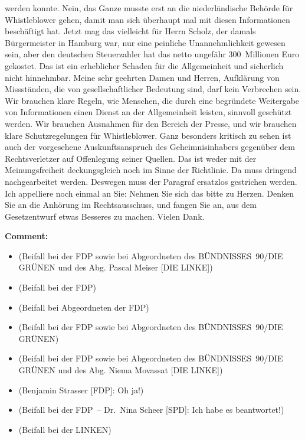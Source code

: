 \documentclass{article}
\begin{document}
werden konnte. Nein, das Ganze musste erst an die niederländische Behörde für Whistleblower gehen, damit man sich überhaupt mal mit diesen Informationen beschäftigt hat. Jetzt mag das vielleicht für Herrn Scholz, der damals Bürgermeister in Hamburg war, nur eine peinliche Unannehmlichkeit gewesen sein, aber den deutschen Steuerzahler hat das netto ungefähr 300 Millionen Euro gekostet. Das ist ein erheblicher Schaden für die Allgemeinheit und sicherlich nicht hinnehmbar.  Meine sehr geehrten Damen und Herren, Aufklärung von Missständen, die von gesellschaftlicher Bedeutung sind, darf kein Verbrechen sein. Wir brauchen klare Regeln, wie Menschen, die durch eine begründete Weitergabe von Informationen einen Dienst an der Allgemeinheit leisten, sinnvoll geschützt werden. Wir brauchen Ausnahmen für den Bereich der Presse, und wir brauchen klare Schutzregelungen für Whistleblower.  Ganz besonders kritisch zu sehen ist auch der vorgesehene Auskunftsanspruch des Geheimnisinhabers gegenüber dem Rechtsverletzer auf Offenlegung seiner Quellen. Das ist weder mit der Meinungsfreiheit deckungsgleich noch im Sinne der Richtlinie. Da muss dringend nachgearbeitet werden. Deswegen muss der Paragraf ersatzlos gestrichen werden.  Ich appelliere noch einmal an Sie: Nehmen Sie sich das bitte zu Herzen. Denken Sie an die Anhörung im Rechtsausschuss, und fangen Sie an, aus dem Gesetzentwurf etwas Besseres zu machen. Vielen Dank.  

\noindent\textbf{Comment:}
\begin{itemize}
    \setlength\itemsep{-3pt}
    \item (Beifall bei der FDP sowie bei Abgeordneten des BÜNDNISSES 90/DIE GRÜNEN und des Abg. Pascal Meiser [DIE LINKE])
    \setlength\itemsep{-3pt}
    \item (Beifall bei der FDP)
    \setlength\itemsep{-3pt}
    \item (Beifall bei Abgeordneten der FDP)
    \setlength\itemsep{-3pt}
    \item (Beifall bei der FDP sowie bei Abgeordneten des BÜNDNISSES 90/DIE GRÜNEN)
    \setlength\itemsep{-3pt}
    \item (Beifall bei der FDP sowie bei Abgeordneten des BÜNDNISSES 90/DIE GRÜNEN und des Abg. Niema Movassat [DIE LINKE])
    \setlength\itemsep{-3pt}
    \item (Benjamin Strasser [FDP]: Oh ja!)
    \setlength\itemsep{-3pt}
    \item (Beifall bei der FDP – Dr. Nina Scheer [SPD]: Ich habe es beantwortet!)
    \setlength\itemsep{-3pt}
    \item (Beifall bei der LINKEN)
\end{itemize}
\end{document}
